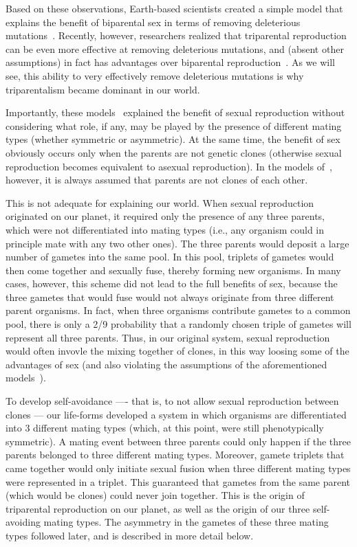 \documentclass{report}
\begin{document}
Based on these observations, Earth-based scientists created a simple model that explains the benefit of biparental sex in terms of removing deleterious mutations~\cite{kondrashov_selection_1982,kondrashov_deleterious_1988}. Recently, however, researchers realized that triparental reproduction can be even more effective at removing deleterious mutations, and (absent other assumptions) in fact has advantages over biparental reproduction~\cite{perry_why_2017}. As we will see, this ability to very effectively remove deleterious mutations is why triparentalism became dominant in our world.

Importantly, these models~\cite{perry_why_2017,kondrashov_selection_1982} explained the benefit of sexual reproduction without considering what role, if any, may be played by the presence of different mating types (whether symmetric or asymmetric). At the same time, the benefit of sex obviously occurs only when the parents are not genetic clones (otherwise sexual reproduction becomes equivalent to asexual reproduction). In the models of~\cite{perry_why_2017,kondrashov_selection_1982}, however, it is always assumed that parents are not clones of each other. 

This is not adequate for explaining our world. When sexual reproduction originated on our planet, it required only the presence of any three parents, which were not differentiated into mating types (i.e., any organism could in principle mate with any two other ones). The three parents would deposit a large number of gametes into the same pool. In this pool, triplets of gametes would then come together and sexually fuse, thereby forming new organisms. In many cases, however, this scheme did not lead to the full benefits of sex, because the three gametes that would fuse would not always originate from three different parent organisms. In fact, when three organisms contribute gametes to a common pool, there is only a 2/9 probability that a randomly chosen triple of gametes will represent all three parents. Thus, in our original system, sexual reproduction would often invovle the mixing together of clones, in this way loosing some of the advantages of sex (and also violating the assumptions of the aforementioned models~\cite{perry_why_2017,kondrashov_selection_1982}).

To develop self-avoidance —- that is, to not allow sexual reproduction between clones — our life-forms developed a system in which organisms are differentiated into 3 different mating types (which, at this point, were still phenotypically symmetric). A mating event between three parents could only happen if the three parents belonged to three different mating types. Moreover, gamete triplets that came together would only initiate sexual fusion when three different mating types were represented in a triplet. This guaranteed that gametes from the same parent (which would be clones) could never join together. This is the origin of triparental reproduction on our planet, as well as the origin of our three self-avoiding mating types. The asymmetry in the gametes of these three mating types followed later, and is described in more detail below.
\end{document}

